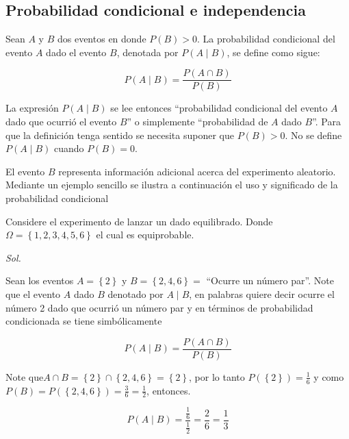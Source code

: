 

\subsection{Probabilidad condicional e independencia}
Sean $A$ y $B$ dos eventos en donde $P (B) > 0$. La probabilidad
condicional del evento $A$ dado el evento $B$, denotada por $P(A\mid B)$, se
define como sigue:

\begin{equation}
    P(A\mid B)=\frac{P(A\cap B)}{P(B)}
\end{equation}


La expresión $P(A\mid B)$ se lee entonces ``probabilidad condicional del
evento $A$ dado que ocurrió el evento $B$'' o simplemente ``probabilidad
de $A$ dado $B$''. Para que la definición tenga sentido se necesita suponer
que $P(B) > 0$. No se define $P (A\mid B)$ cuando $P (B) = 0$.

El evento $B$ representa información adicional acerca del experimento
aleatorio. Mediante un ejemplo sencillo se ilustra a continuación el uso
y significado de la probabilidad condicional


\begin{example}
    Considere el experimento de lanzar un dado equilibrado.
    Donde $\Omega= \left\{ 1, 2, 3, 4, 5, 6 \right\}$ el cual es equiprobable.
\end{example}

\textit{ Sol. }

Sean los eventos $A=\left\{2\right\}$  y $B=\left\{2, 4, 6\right\} =$  ``Ocurre un número par''.
Note que el evento $A$ dado $B$ denotado por $A\mid B$, en palabras quiere
decir ocurre el número 2 dado que ocurrió un número par y en
términos de probabilidad condicionada se tiene simbólicamente

\begin{equation}
    P( A\mid  B)=\frac{P( A\cap B)}{P(B)}
\end{equation}

Note que$ A\cap B= \left\{2\right\}\cap \left\{2,4,6\right\}=\left\{2\right\}$, por lo tanto $P(\left\{2\right\})=\frac{1}{6}$ y como
$P(B)=P(\left\{2,4,6\right\})=\frac{3}{6}=\frac{1}{2}$, entonces.

\begin{equation*}
    P( A\mid  B)=\frac{\frac{1}{6}}{\frac{1}{2}}=\frac{2}{6}=\frac{1}{3}
\end{equation*}

